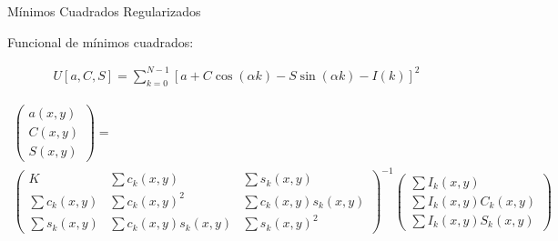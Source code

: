 \documentclass[]{beamer}
\begin{document}
\begin{frame}{M\'inimos Cuadrados Regularizados}

Funcional de m\'inimos cuadrados:
\begin{center}
\begin{align}
  U[a,C,S]= \sum_{k=0}^{N-1}\left[a + C \cos(\alpha k)\right.
  -\left. S \sin(\alpha k)-I(k) \right]^2
\end{align}

\pause
\scriptsize{
\begin{multline*}
\left(\begin{array}{c}
a(x,y)\\
C(x,y)\\
S(x,y)
\end{array}\right) = \\
\left(\begin{array}{ccc}
K & \sum c_{k}(x,y) & \sum s_{k}(x,y)\\
\sum c_{k}(x,y) & \sum c_{k}(x,y)^{2} & \sum c_{k}(x,y)s_{k}(x,y)\\
\sum s_{k}(x,y) & \sum c_{k}(x,y)s_{k}(x,y) & \sum s_{k}(x,y)^{2}
\end{array}\right)^{-1}
\left(\begin{array}{c}
\sum I_{k}(x,y)\\
\sum I_{k}(x,y)C_{k}(x,y)\\
\sum I_{k}(x,y)S_{k}(x,y)
\end{array}\right)
\end{multline*}
}


\end{center}
\end{frame}
\end{document}
